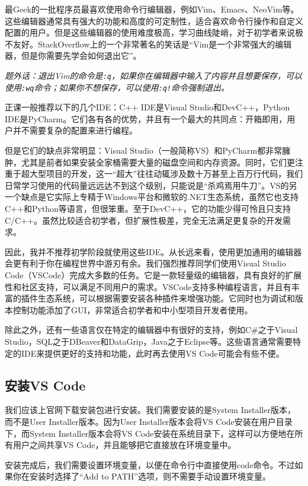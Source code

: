 \documentclass[../main.tex]{subfiles}
\begin{document}
最Geek的一批程序员最喜欢使用命令行编辑器，例如Vim、Emacs、NeoVim等。这些编辑器通常具有强大的功能和高度的可定制性，适合喜欢命令行操作和自定义配置的用户。但是这些编辑器的使用难度极高，学习曲线陡峭，对于初学者来说极不友好。StackOverflow上的一个非常著名的笑话是“Vim是一个非常强大的编辑器，但是你需要先学会如何退出它”。

\textit{题外话：退出Vim的命令是\texttt{:q}，如果你在编辑器中输入了内容并且想要保存，可以使用\texttt{:wq}命令；如果你不想保存，可以使用\texttt{:q!}命令强制退出。}

正课一般推荐以下的几个IDE：C++ IDE是Visual Studio和DevC++，Python IDE是PyCharm。它们各有各的优势，并且有一个最大的共同点：开箱即用，用户并不需要复杂的配置来进行编程。

但是它们的缺点非常明显：Visual Studio（一般简称VS）和PyCharm都非常臃肿，尤其是前者如果安装全家桶需要大量的磁盘空间和内存资源。同时，它们更注重于超大型项目的开发，这一“超大”往往动辄涉及数十万甚至上百万行代码，我们日常学习使用的代码量远远达不到这个级别，只能说是“杀鸡焉用牛刀”。VS的另一个缺点是它实际上专精于Windows平台和微软的.NET生态系统，虽然它也支持C++和Python等语言，但很笨重。至于DevC++，它的功能少得可怜且只支持C/C++。虽然比较适合初学者，但扩展性极差，完全无法满足更复杂的开发需求。

因此，我并不推荐初学阶段就使用这些IDE。从长远来看，使用更加通用的编辑器会更有利于你在编程世界中游刃有余。我们强烈推荐同学们使用Visual Studio Code（VSCode）完成大多数的任务。它是一款轻量级的编辑器，具有良好的扩展性和社区支持，可以满足不同用户的需求。VSCode支持多种编程语言，并且有丰富的插件生态系统，可以根据需要安装各种插件来增强功能。它同时也为调试和版本控制功能添加了GUI，非常适合初学者和中小型项目开发者使用。

除此之外，还有一些语言仅在特定的编辑器中有很好的支持，例如C\#之于Visual Studio，SQL之于DBeaver和DataGrip，Java之于Eclipse等。这些语言通常需要特定的IDE来提供更好的支持和功能，此时再去使用VS Code可能会有些不便。

\subsection{安装VS Code}

我们应该上官网下载安装包进行安装。我们需要安装的是System Installer版本，而不是User Installer版本。因为User Installer版本会将VS Code安装在用户目录下，而System Installer版本会将VS Code安装在系统目录下，这样可以方便地在所有用户之间共享VS Code，并且能够把它直接放在环境变量中。

安装完成后，我们需要设置环境变量，以便在命令行中直接使用code命令。不过如果你在安装时选择了“Add to PATH”选项，则不需要手动设置环境变量。
\end{document}
